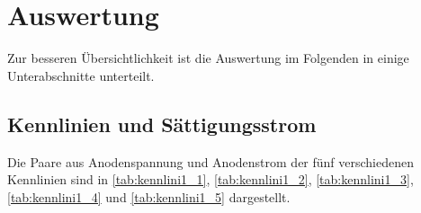 \section{Auswertung}
\label{sec:auswertung}

Zur besseren Übersichtlichkeit ist die Auswertung im Folgenden in einige Unterabschnitte unterteilt.

\subsection{Kennlinien und Sättigungsstrom}

Die Paare aus Anodenspannung und Anodenstrom der fünf verschiedenen Kennlinien sind in \autoref{tab:kennlini1_1}, \autoref{tab:kennlini1_2}, \autoref{tab:kennlini1_3}, \autoref{tab:kennlini1_4} und \autoref{tab:kennlini1_5} dargestellt.

